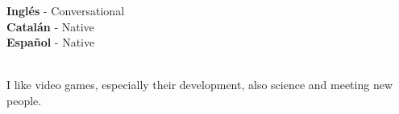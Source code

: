 \documentclass[9pt]{developercv} %
\begin{document}

\begin{minipage}[t]{0.3\textwidth}
	\vspace{-\baselineskip} %

	
	\textbf{Inglés} - Conversational\\
	\textbf{Catalán} - Native\\
	\textbf{Español} - Native
\end{minipage}
\hfill
\begin{minipage}[t]{0.3\textwidth}
	\vspace{-\baselineskip} %
	
	\\
	I like video games, especially their development, also science and meeting new people.
	
\end{minipage}
\hfill

\end{document}

